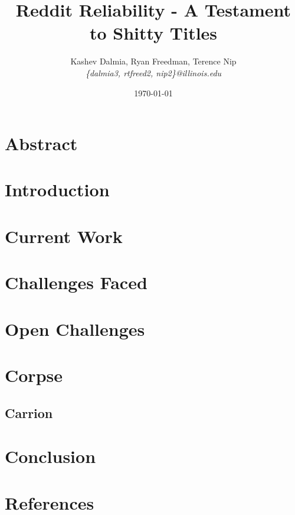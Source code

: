 \documentclass[a4paper]{article}
\title{Reddit Reliability - A Testament to Shitty Titles}
\author{Kashev Dalmia, Ryan Freedman, Terence Nip \\
        \textit{\{dalmia3, rtfreed2, nip2\}@illinois.edu}
       }
\date{\today}
\begin{document}
\maketitle

\section{Abstract}
\label{sec:Abstract}



\section{Introduction}
\label{sec:Introduction}


\section{Current Work}
\label{ sec:CurrentWork}


\section{Challenges Faced}
\label{sec:ChallengesFaced}


\section{Open Challenges}
\label{sec:OpenChallenges}


\section{Corpse} %
\subsection{Carrion}
\label{sec:Body}


\section{Conclusion}
\label{sec:Conclusion}


\section{References}
\label{sec:References}

\end{document}
